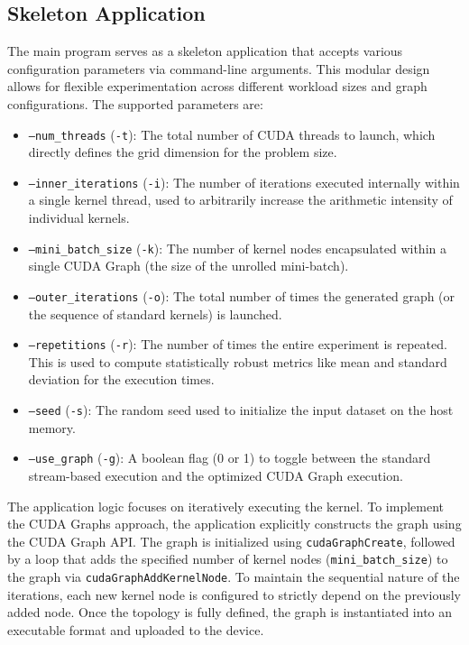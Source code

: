 \documentclass[10pt,twocolumn]{article}
\begin{document}
\subsection{Skeleton Application}
The main program serves as a skeleton application that accepts various configuration parameters via command-line arguments. This modular design allows for flexible experimentation across different workload sizes and graph configurations. The supported parameters are:
\begin{itemize}
    \item \texttt{---num\_threads} (\texttt{-t}): The total number of CUDA threads to launch, which directly defines the grid dimension for the problem size.
    \item \texttt{---inner\_iterations} (\texttt{-i}): The number of iterations executed internally within a single kernel thread, used to arbitrarily increase the arithmetic intensity of individual kernels.
    \item \texttt{---mini\_batch\_size} (\texttt{-k}): The number of kernel nodes encapsulated within a single CUDA Graph (the size of the unrolled mini-batch).
    \item \texttt{---outer\_iterations} (\texttt{-o}): The total number of times the generated graph (or the sequence of standard kernels) is launched.
    \item \texttt{---repetitions} (\texttt{-r}): The number of times the entire experiment is repeated. This is used to compute statistically robust metrics like mean and standard deviation for the execution times.
    \item \texttt{---seed} (\texttt{-s}): The random seed used to initialize the input dataset on the host memory.
    \item \texttt{---use\_graph} (\texttt{-g}): A boolean flag (0 or 1) to toggle between the standard stream-based execution and the optimized CUDA Graph execution.
\end{itemize}

The application logic focuses on iteratively executing the kernel. To implement the CUDA Graphs approach, the application explicitly constructs the graph using the CUDA Graph API. The graph is initialized using \texttt{cudaGraphCreate}, followed by a loop that adds the specified number of kernel nodes (\texttt{mini\_batch\_size}) to the graph via \texttt{cudaGraphAddKernelNode}. To maintain the sequential nature of the iterations, each new kernel node is configured to strictly depend on the previously added node. Once the topology is fully defined, the graph is instantiated into an executable format and uploaded to the device.
\end{document}
